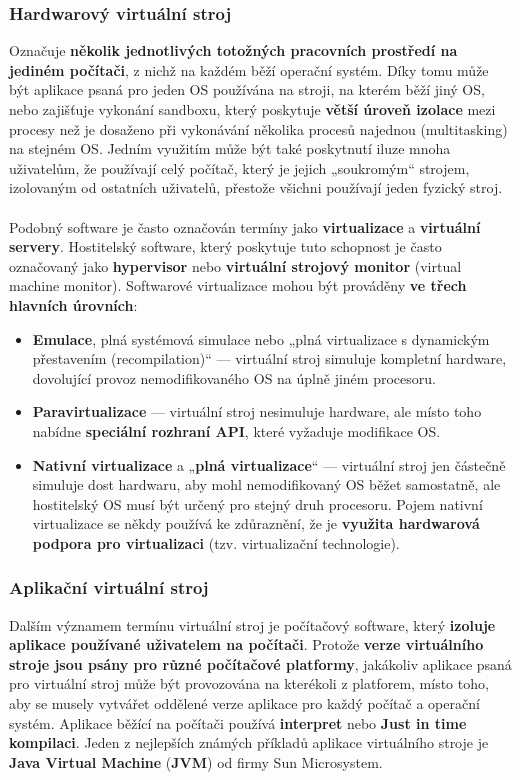 \subsubsection{Hardwarový virtuální stroj}
Označuje \textbf{několik jednotlivých totožných pracovních prostředí na jediném počítači}, z nichž na každém běží operační systém. Díky tomu může být aplikace psaná pro jeden OS používána na stroji, na kterém běží jiný OS, nebo zajišťuje vykonání sandboxu, který poskytuje \textbf{větší úroveň izolace} mezi procesy než je dosaženo při vykonávání několika procesů najednou (multitasking) na stejném OS. Jedním využitím může být také poskytnutí iluze mnoha uživatelům, že používají celý počítač, který je jejich „soukromým“ strojem, izolovaným od ostatních uživatelů, přestože všichni používají jeden fyzický stroj.
\\\\
Podobný software je často označován termíny jako \textbf{virtualizace} a \textbf{virtuální servery}. Hostitelský software, který poskytuje tuto schopnost je často označovaný jako \textbf{hypervisor} nebo \textbf{virtuální strojový monitor} (virtual machine monitor). Softwarové virtualizace mohou být prováděny \textbf{ve třech hlavních úrovních}:
\begin{itemize}
\item \textbf{Emulace}, plná systémová simulace nebo „plná virtualizace s dynamickým přestavením (recompilation)“ — virtuální stroj simuluje kompletní hardware, dovolující provoz nemodifikovaného OS na úplně jiném procesoru.
\item\textbf{Paravirtualizace} — virtuální stroj nesimuluje hardware, ale místo toho nabídne \textbf{speciální rozhraní API}, které vyžaduje modifikace OS.
\item\textbf{Nativní virtualizace} a „\textbf{plná virtualizace}“ — virtuální stroj jen částečně simuluje dost hardwaru, aby mohl nemodifikovaný OS běžet samostatně, ale hostitelský OS musí být určený pro stejný druh procesoru. Pojem nativní virtualizace se někdy používá ke zdůraznění, že je \textbf{využita hardwarová podpora pro virtualizaci} (tzv. virtualizační technologie).
\end{itemize}

\subsubsection{Aplikační virtuální stroj}
Dalším významem termínu virtuální stroj je počítačový software, který\textbf{ izoluje aplikace používané uživatelem na počítači}. Protože \textbf{verze virtuálního stroje jsou psány pro různé počítačové platformy}, jakákoliv aplikace psaná pro virtuální stroj může být provozována na kterékoli z platforem, místo toho, aby se musely vytvářet oddělené verze aplikace pro každý počítač a operační systém. Aplikace běžící na počítači používá \textbf{interpret} nebo \textbf{Just in time kompilaci}. Jeden z nejlepších známých příkladů aplikace virtuálního stroje je \textbf{Java Virtual Machine} (\textbf{JVM}) od firmy Sun Microsystem.

